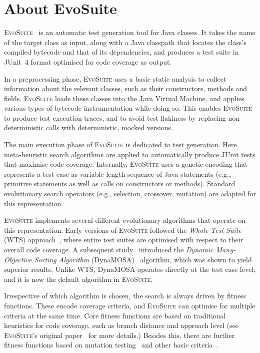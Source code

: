 \documentclass[10pt,conference]{IEEEtran}
\newcommand{\EVOSUITE}{\textsc{EvoSuite}\xspace}
\begin{document}
\section{About EvoSuite}

\EVOSUITE~\cite{FrA11c} is an automatic test generation tool for Java classes.
It takes the name of the target class as input, along with a Java classpath that
locates the class's compiled bytecode and that of its dependencies, and produces
a test suite in JUnit~4 format optimised for code coverage as output.

In a preprocessing phase, \EVOSUITE uses a basic static analysis to collect
information about the relevant classes, such as their constructors, methods
and fields. \EVOSUITE loads these classes into the Java Virtual Machine, and
applies various types of  bytecode instrumentation while doing so. This enables \EVOSUITE
to produce test execution traces, and to avoid test flakiness by replacing
non-deterministic calls with deterministic, mocked versions.

The main execution phase of \EVOSUITE is dedicated to test generation. Here,
meta-heuristic search algorithms are applied to automatically produce JUnit
tests that maximise code coverage. Internally, \EVOSUITE uses a genetic encoding
that represents a test case as variable-length sequence of Java statements
(e.g., primitive statements as well as calls on constructors or methods).
Standard evolutionary search operators (e.g., selection, crossover, mutation)
are adapted for this representation.

\EVOSUITE implements several different evolutionary algorithms that operate on this
representation. Early versions of \EVOSUITE followed the \emph{Whole Test Suite} (WTS)
approach~\cite{GoA_TSE12}, where entire test suites are optimised with
respect to their overall code coverage. A subsequent study~\cite{ea_evaluation}
introduced the \emph{Dynamic Many-Objective Sorting Algorithm} (DynaMOSA)~\cite{dynamosa} algorithm, which was shown
to yield superior results. Unlike WTS, DynaMOSA operates directly at the test case level,
and it is now the default algorithm in \EVOSUITE.

Irrespective of which algorithm is chosen, the search is always driven by fitness
functions. These encode coverage criteria, and \EVOSUITE can optimise for multiple
criteria at the same time. Core fitness functions are based on traditional heuristics
for code coverage, such as branch distance and approach level (see \EVOSUITE's original paper~\cite{GoA_TSE12} for more details.)
Besides this, there are further fitness functions based on mutation
testing~\cite{emse14_mutation} and other basic criteria~\cite{rojas2015combining}.
\end{document}
